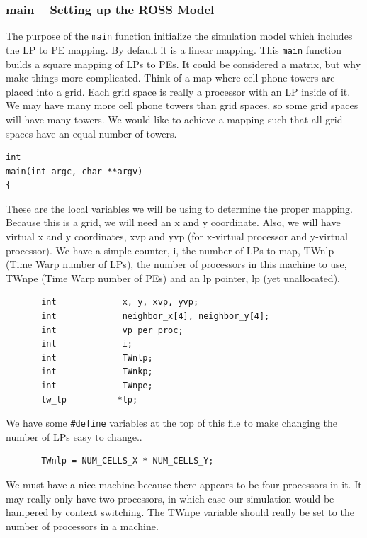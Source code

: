\documentclass[12pt]{article}
\begin{document}
\subsubsection{main -- Setting up the ROSS Model}
The purpose of the {\tt main} function initialize the simulation model which
includes the LP to PE mapping. By default it is a linear mapping.  This 
{\tt main}
function builds a square mapping of LPs to PEs.  It could be considered a
matrix, but why make things more complicated.  Think of a map where cell phone
towers are placed into a grid.  Each grid space is really a processor with an
LP inside of it.  We may have many more cell phone towers than grid spaces, so
some grid spaces will have many towers.  We would like to achieve a mapping
such that all grid spaces have an equal number of towers.

\begin{verbatim}
int
main(int argc, char **argv)
{
\end{verbatim}

These are the local variables we will be using to determine the proper
mapping.  Because this is a grid, we will need an x and y coordinate.  Also,
we will have virtual x and y coordinates, xvp and yvp (for x-virtual processor
and y-virtual processor).  We have a simple counter, i, the number of LPs to
map, TWnlp (Time Warp number of LPs), the number of processors in this machine
to use, TWnpe (Time Warp number of PEs) and an lp pointer, lp (yet
unallocated).
 
\begin{verbatim}
       int             x, y, xvp, yvp;
       int             neighbor_x[4], neighbor_y[4];
       int             vp_per_proc;
       int             i;
       int             TWnlp;
       int             TWnkp;
       int             TWnpe;
       tw_lp          *lp;
\end{verbatim}
 
We have some {\tt \#define} variables at the top of this file to make
changing the number of LPs easy to change..

\begin{verbatim}      
       TWnlp = NUM_CELLS_X * NUM_CELLS_Y;
\end{verbatim}
 

We must have a nice machine because there appears to be four
processors in it.  It may really only have two processors, in which
case our simulation would be hampered by context switching.  The TWnpe
variable should really be set to the number of processors in a
machine.
\end{document}
